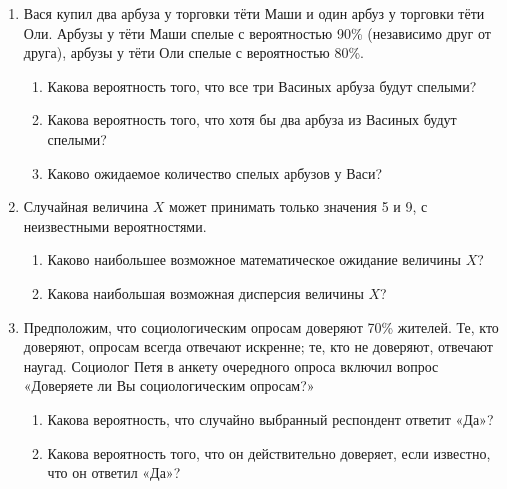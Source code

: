 \begin{enumerate}
\item Вася купил два арбуза у торговки тёти Маши и один арбуз у торговки тёти Оли.
Арбузы у тёти Маши спелые с вероятностью 90\% (независимо друг от друга), арбузы у
тёти Оли спелые с вероятностью 80\%.
\begin{enumerate}
\item Какова вероятность того, что все три Васиных арбуза будут спелыми?
\item Какова вероятность того, что хотя бы два арбуза из Васиных будут спелыми?
\item Каково ожидаемое количество спелых арбузов у Васи?
\end{enumerate}

\item Случайная величина $X$ может принимать только значения 5 и 9, с неизвестными
вероятностями.
\begin{enumerate}
\item Каково наибольшее возможное математическое ожидание величины $X$?
\item Какова наибольшая возможная дисперсия величины $X$?
\end{enumerate}



\item Предположим, что социологическим опросам доверяют 70\% жителей. Те, кто
доверяют, опросам всегда отвечают искренне; те, кто не доверяют, отвечают наугад.
Социолог Петя  в анкету очередного опроса включил вопрос «Доверяете ли Вы
социологическим опросам?»
\begin{enumerate}
\item Какова вероятность, что случайно выбранный респондент ответит «Да»?
\item Какова вероятность того, что он действительно доверяет, если известно, что
он ответил «Да»?
\end{enumerate}


\end{enumerate}
